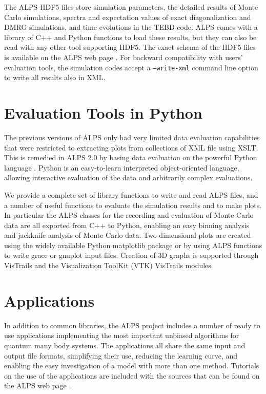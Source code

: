 \documentclass[12pt]{iopart}
\begin{document}
The ALPS HDF5 files store simulation parameters, the detailed results of Monte Carlo simulations, spectra and expectation values of exact diagonalization and DMRG simulations, and time evolutions in the TEBD code. ALPS comes with a library of C++ and Python functions to load these results, but they can also be read with any other tool supporting HDF5. The exact schema of the HDF5 files is available on the ALPS web page \cite{alps}. For backward compatibility with users' evaluation tools, the simulation codes accept a {\tt --write-xml} command line option to write all results also in XML. 

\section{Evaluation Tools in Python}

The previous versions of ALPS  only had very limited data evaluation capabilities that were restricted to extracting plots from collections of XML file using XSLT. This is remedied in ALPS 2.0 by basing data evaluation on the powerful Python language \cite{python}. Python is an easy-to-learn interpreted object-oriented language, allowing interactive evaluation of the data and arbitrarily complex evaluations. 

We provide a complete set of library functions to write and read ALPS files, and a number of useful functions to evaluate the simulation results and to make plots. In particular the ALPS classes for the recording and evaluation of Monte Carlo data are all exported from C++ to Python, enabling an easy binning analysis \cite{Ambegaokar2010} and jackknife analysis of Monte Carlo data.
Two-dimensional plots are created using the widely available Python matplotlib package \cite{matplotlib} or by using ALPS functions to write grace \cite{grace} or gnuplot \cite{gnuplot} input files. Creation of 3D graphs is supported through VisTrails and the Visualization ToolKit (VTK) \cite{vtk} VisTrails modules.



\section{Applications}
\label{sec:applications}
In addition to common libraries, the ALPS project includes a number of ready to use applications implementing the most important unbiased
algorithms for quantum many body systems. The applications all
share the same input and output file formats, simplifying their use, reducing the
learning curve, and enabling the easy investigation of a model with
more than one method. Tutorials on the use of the applications are
included with the sources that can be found on the ALPS web
page \cite{alps}.
\end{document}
